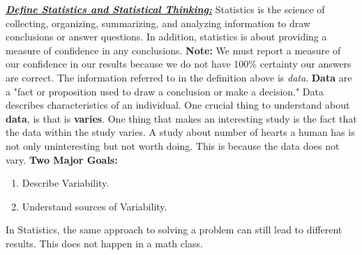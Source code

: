 \documentclass{report}
\begin{document}
    \bigbreak \noindent \bigbreak \noindent 
    \textbf{\textit{\underline{Define Statistics and Statistical Thinking:}}}
    \bigbreak \noindent
        Statistics is the science of collecting, organizing, summarizing, and analyzing information to draw conclusions or answer questions. In addition, statistics is about providing a measure of confidence in any conclusions.
        \bigbreak \noindent 
        \textbf{Note:} We must report a measure of our confidence in our results because we do not have 100\% certainty our answers are correct.
        \bigbreak \noindent 
        The information referred to in the definition above is \textit{data}. \textbf{Data} are a "fact or proposition used to draw a conclusion or make a decision." Data describes characteristics of an individual.
        \bigbreak \noindent 
        One crucial thing to understand about \textbf{data}, is that is \textbf{varies}. One thing that makes an interesting study is the fact that the data within the study varies. A study about number of hearts a human has is not only uninteresting but not worth doing. This is because the data does not vary.
        \bigbreak \noindent 
        \textbf{Two Major Goals:}
        \begin{enumerate}
            \item Describe Variability.
            \item Understand sources of Variability.
        \end{enumerate}
        \bigbreak \noindent 
        In Statistics, the same approach to solving a problem can still lead to different results. This does not happen in a math class.
        \vspace{1em}
\end{document}
